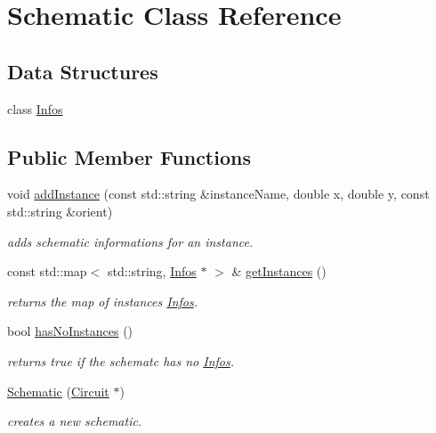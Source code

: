 \hypertarget{class_open_chams_1_1_schematic}{}\section{Schematic Class Reference}
\label{class_open_chams_1_1_schematic}
\subsection*{Data Structures}
\begin{DoxyCompactItemize}
\item 
class \mbox{\hyperlink{class_open_chams_1_1_schematic_1_1_infos}{Infos}}
\end{DoxyCompactItemize}
\subsection*{Public Member Functions}
\begin{DoxyCompactItemize}
\item 
void \mbox{\hyperlink{class_open_chams_1_1_schematic_ac7fc9f5cdf1e22c53d42e6606e1af8ef}{add\+Instance}} (const std\+::string \&instance\+Name, double x, double y, const std\+::string \&orient)
\begin{DoxyCompactList}\small\item\em adds schematic informations for an instance. \end{DoxyCompactList}\item 
\mbox{\label{class_open_chams_1_1_schematic_afa015b02922d82de9c44e8ffe8dc5d56}} 
const std\+::map$<$ std\+::string, \mbox{\hyperlink{class_open_chams_1_1_schematic_1_1_infos}{Infos}} $\ast$ $>$ \& \mbox{\hyperlink{class_open_chams_1_1_schematic_afa015b02922d82de9c44e8ffe8dc5d56}{get\+Instances}} ()
\begin{DoxyCompactList}\small\item\em returns the map of instance\textquotesingle{}s \mbox{\hyperlink{class_open_chams_1_1_schematic_1_1_infos}{Infos}}. \end{DoxyCompactList}\item 
\mbox{\label{class_open_chams_1_1_schematic_adab62a25face462baec9a7fffb2b6158}} 
bool \mbox{\hyperlink{class_open_chams_1_1_schematic_adab62a25face462baec9a7fffb2b6158}{has\+No\+Instances}} ()
\begin{DoxyCompactList}\small\item\em returns true if the schematc has no \mbox{\hyperlink{class_open_chams_1_1_schematic_1_1_infos}{Infos}}. \end{DoxyCompactList}\item 
\mbox{\hyperlink{class_open_chams_1_1_schematic_a88d7382ee58bc8d509a8f9b05a57e8b3}{Schematic}} (\mbox{\hyperlink{class_open_chams_1_1_circuit}{Circuit}} $\ast$)
\begin{DoxyCompactList}\small\item\em creates a new schematic. \end{DoxyCompactList}\end{DoxyCompactItemize}


